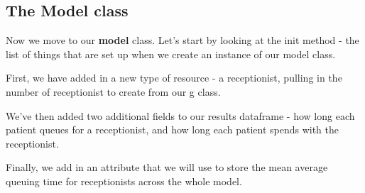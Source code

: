 \documentclass[
  letterpaper,
  DIV=11,
  numbers=noendperiod]{scrreprt}
\begin{document}
\subsection{The Model class}\label{the-model-class}

Now we move to our \textbf{model} class. Let's start by looking at the
init method - the list of things that are set up when we create an
instance of our model class.

First, we have added in a new type of resource - a receptionist, pulling
in the number of receptionist to create from our g class.

We've then added two additional fields to our results dataframe - how
long each patient queues for a receptionist, and how long each patient
spends with the receptionist.

Finally, we add in an attribute that we will use to store the mean
average queuing time for receptionists across the whole model.
\end{document}
